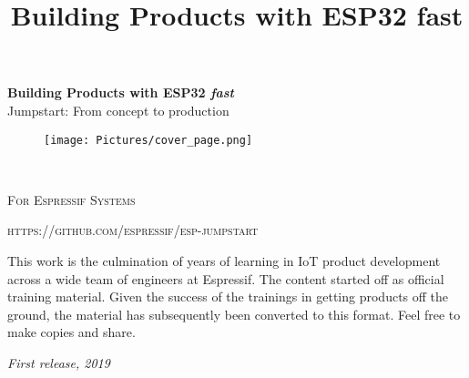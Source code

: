 \documentclass[11pt,fleqn]{book} %
\begin{document}
\title{Building Products with ESP32 fast}


\begingroup
\thispagestyle{empty}
\centering
\vspace*{5cm}
\par\normalfont\fontsize{35}{35}\sffamily\selectfont
\textbf{Building Products with ESP32 \textit{fast}}\\
{\LARGE Jumpstart: From concept to production}\par %
\vspace*{1cm}
{\Huge  }\par %
\begin{figure}[h]
    \centering
    \texttt{[image: Pictures/cover\_page.png]}
\end{figure}

\endgroup


\newpage
~\vfill
\thispagestyle{empty}


\noindent \textsc{For Espressif Systems}

\noindent \textsc{https://github.com/espressif/esp-jumpstart} %

\noindent This work is the culmination of years of learning in  IoT product development across a wide team of engineers at Espressif. The content started off as official training material. Given the success of the trainings in getting products off the ground, the material has subsequently been converted to this format. Feel free to make copies and share. %

\noindent \textit{First release, 2019} %

\end{document}
